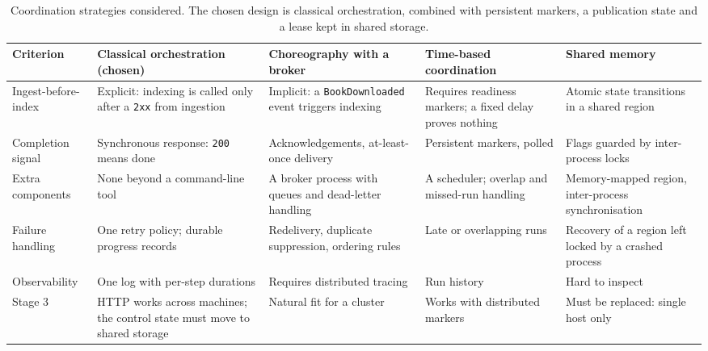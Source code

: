 \documentclass[10pt,a4paper]{article}
\newcommand{\code}[1]{\texttt{#1}}
\begin{document}
\begin{table}[htbp]
  \centering
  \footnotesize
  \caption{Coordination strategies considered. The chosen design is classical
  orchestration, combined with persistent markers, a publication state and a
  lease kept in shared storage.}
  \label{tab:coordination}
  \begin{tabularx}{\textwidth}{@{}>{\raggedright\arraybackslash}p{2.3cm}>{\raggedright\arraybackslash}X>{\raggedright\arraybackslash}X>{\raggedright\arraybackslash}X>{\raggedright\arraybackslash}X@{}}
    \toprule
    Criterion & \textbf{Classical orchestration} (chosen) & Choreography with a
      broker & Time-based coordination & Shared memory \\
    \midrule
    Ingest-before-index & Explicit: indexing is called only after a
      \code{2xx} from ingestion & Implicit: a \code{BookDownloaded} event
      triggers indexing & Requires readiness markers; a fixed delay proves
      nothing & Atomic state transitions in a shared region \\
    Completion signal & Synchronous response: \code{200} means done &
      Acknowledgements, at-least-once delivery & Persistent markers, polled &
      Flags guarded by inter-process locks \\
    Extra components & None beyond a command-line tool & A broker process with
      queues and dead-letter handling & A scheduler; overlap and missed-run
      handling & Memory-mapped region, inter-process synchronisation \\
    Failure handling & One retry policy; durable progress records & Redelivery,
      duplicate suppression, ordering rules & Late or overlapping runs & Recovery
      of a region left locked by a crashed process \\
    Observability & One log with per-step durations & Requires distributed
      tracing & Run history & Hard to inspect \\
    Stage 3 & HTTP works across machines; the control state must move to
      shared storage & Natural fit for a cluster & Works with distributed markers
      & Must be replaced: single host only \\
    \bottomrule
  \end{tabularx}
\end{table}
\end{document}
